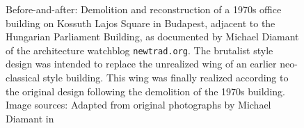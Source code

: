 \documentclass{article}
\begin{document}
\begin{figure}[ht!]
    \centering
    \caption{Before-and-after: Demolition and reconstruction of a 1970s office building on Kossuth Lajos Square in Budapest, adjacent to the Hungarian Parliament Building, as documented by Michael Diamant of the architecture watchblog \texttt{newtrad.org}. The brutalist style design was intended to replace the unrealized wing of an earlier neo-classical style building. This wing was finally realized according to the original design following the demolition of the 1970s building. Image sources: Adapted from original photographs by Michael Diamant in \cite{natalia_michael_2021} }
    \label{fig:budaptest}
\end{figure}
\end{document}
